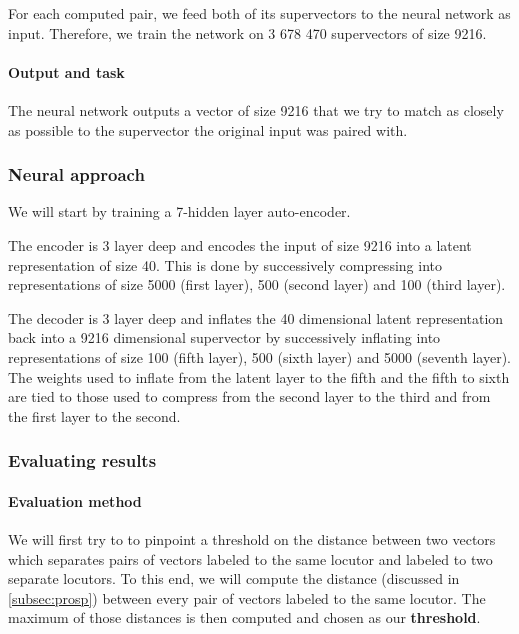 \documentclass[conference]{IEEEtran}
\begin{document}
For each computed pair, we feed both of its supervectors to the neural network as
input. Therefore, we train the network on 3 678 470 supervectors of size 9216.

\paragraph{Output and task}

The neural network outputs a vector of size 9216 that we try to match as closely
as possible to the supervector the original input was paired with.

\subsubsection{Neural approach}

We will start by training a 7-hidden layer auto-encoder.

The encoder is 3 layer
deep and encodes the input of size 9216 into a latent representation of size 40.
This is done by successively compressing into representations of size 5000
(first layer), 500 (second layer) and 100 (third layer).

The decoder is 3 layer deep and inflates the 40 dimensional latent
representation back into a 9216 dimensional supervector by successively
inflating into representations of size 100 (fifth layer), 500 (sixth layer) and
5000 (seventh layer). The weights used to inflate from the latent layer to the
fifth and the fifth to sixth are tied to those used to compress from the second
layer to the third and from the first
layer to the second.


\subsubsection{Evaluating results}

\paragraph{Evaluation method}

We will first try to to pinpoint a threshold on the distance
between two vectors which separates pairs of vectors labeled to the same locutor
and labeled to two separate locutors. To this end, we will compute the distance
(discussed in \ref{subsec:prosp}) between every pair of vectors labeled to the
same locutor. The maximum of those distances is then computed and chosen as our
\textbf{threshold}.
\end{document}
